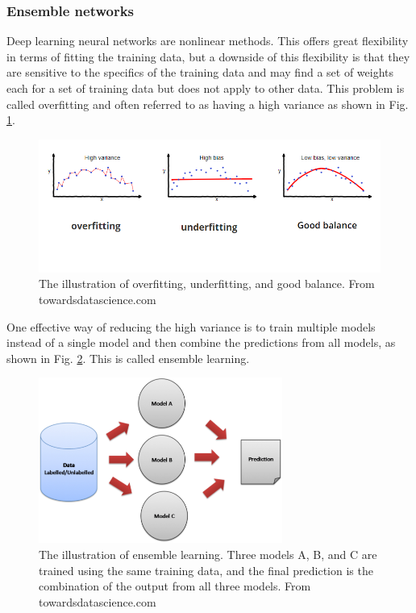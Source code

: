 \subsubsection{Ensemble networks}
Deep learning neural networks are nonlinear methods. This offers great flexibility in terms of fitting the training data, but a downside of this flexibility is that they are sensitive to the specifics of the training data and may find a set of weights each for a set of training data but does not apply to other data. This problem is called overfitting and often referred to as having a high variance \cite{goodfellow2016deep} as shown in Fig. \ref{fig_over_under_fitting}.
\begin{figure}[h!]
\begin{center}
\includegraphics[width = 13cm]{img/over_under_fiting.png}
\caption[The illustration of overfitting, underfitting, and good balance]{The illustration of overfitting, underfitting, and good balance. From towardsdatascience.com \label{fig_over_under_fitting}}
\end{center}
\end{figure}

One effective way of reducing the high variance is to train multiple models instead of a single model and then combine the predictions from all models, as shown in Fig. \ref{fig_ensemble_learning}. This is called ensemble learning.
\begin{figure}[h!]
\begin{center}
\includegraphics[width = 8cm]{img/ensemble_learning.png}
\caption[The illustration of ensemble learning]{The illustration of ensemble learning. Three models A, B, and C are trained using the same training data, and the final prediction is the combination of the output from all three models. From towardsdatascience.com \label{fig_ensemble_learning}}
\end{center}
\end{figure}
